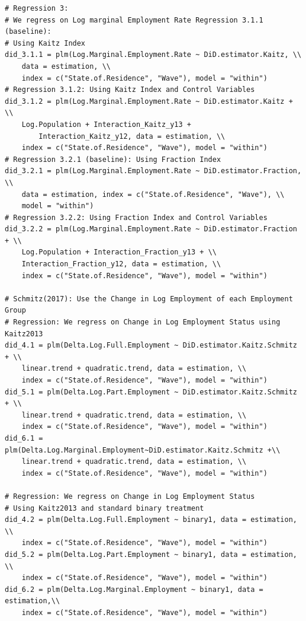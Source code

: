 \documentclass[a4paper]{article}
\begin{document}
{\begin{lstlisting}
# Regression 3: 
# We regress on Log marginal Employment Rate Regression 3.1.1 (baseline): 
# Using Kaitz Index
did_3.1.1 = plm(Log.Marginal.Employment.Rate ~ DiD.estimator.Kaitz, \\ 
	data = estimation, \\ 
	index = c("State.of.Residence", "Wave"), model = "within")
# Regression 3.1.2: Using Kaitz Index and Control Variables
did_3.1.2 = plm(Log.Marginal.Employment.Rate ~ DiD.estimator.Kaitz + \\ 
	Log.Population + Interaction_Kaitz_y13 + 
    	Interaction_Kaitz_y12, data = estimation, \\ 
	index = c("State.of.Residence", "Wave"), model = "within")
# Regression 3.2.1 (baseline): Using Fraction Index
did_3.2.1 = plm(Log.Marginal.Employment.Rate ~ DiD.estimator.Fraction, \\ 
	data = estimation, index = c("State.of.Residence", "Wave"), \\ 
	model = "within")
# Regression 3.2.2: Using Fraction Index and Control Variables
did_3.2.2 = plm(Log.Marginal.Employment.Rate ~ DiD.estimator.Fraction + \\ 
	Log.Population + Interaction_Fraction_y13 + \\ 
	Interaction_Fraction_y12, data = estimation, \\ 
	index = c("State.of.Residence", "Wave"), model = "within")

# Schmitz(2017): Use the Change in Log Employment of each Employment Group 
# Regression: We regress on Change in Log Employment Status using Kaitz2013
did_4.1 = plm(Delta.Log.Full.Employment ~ DiD.estimator.Kaitz.Schmitz + \\ 
	linear.trend + quadratic.trend, data = estimation, \\ 
	index = c("State.of.Residence", "Wave"), model = "within")
did_5.1 = plm(Delta.Log.Part.Employment ~ DiD.estimator.Kaitz.Schmitz + \\ 
	linear.trend + quadratic.trend, data = estimation, \\ 
	index = c("State.of.Residence", "Wave"), model = "within")
did_6.1 = plm(Delta.Log.Marginal.Employment~DiD.estimator.Kaitz.Schmitz +\\ 
	linear.trend + quadratic.trend, data = estimation, \\ 
	index = c("State.of.Residence", "Wave"), model = "within")

# Regression: We regress on Change in Log Employment Status 
# Using Kaitz2013 and standard binary treatment
did_4.2 = plm(Delta.Log.Full.Employment ~ binary1, data = estimation, \\ 
	index = c("State.of.Residence", "Wave"), model = "within")
did_5.2 = plm(Delta.Log.Part.Employment ~ binary1, data = estimation, \\ 
	index = c("State.of.Residence", "Wave"), model = "within")
did_6.2 = plm(Delta.Log.Marginal.Employment ~ binary1, data = estimation,\\ 
	index = c("State.of.Residence", "Wave"), model = "within")


\end{lstlisting}}
\end{document}
